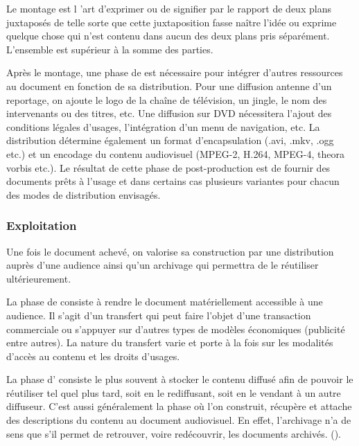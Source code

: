 \begin{cico}
Le montage est l 'art d'exprimer ou de signifier par le rapport de deux plans juxtaposés de telle sorte que cette juxtaposition fasse naître l'idée ou exprime quelque chose qui n'est contenu dans aucun des deux plans pris séparément. L'ensemble est supérieur à la somme des parties.
\end{cico}

Après le montage, une phase de  est nécessaire pour intégrer d'autres ressources au document en fonction de sa distribution. 
Pour une diffusion antenne d'un reportage, on ajoute le logo de la chaîne de télévision, un jingle, le nom des intervenants ou des titres, etc. 
Une diffusion sur DVD nécessitera l'ajout des conditions
légales d'usages, l'intégration d'un menu de navigation, etc. 
La distribution détermine également un format d'encapsulation (.avi, .mkv, .ogg etc.) et un encodage du contenu audiovisuel (MPEG-2, H.264, MPEG-4, theora vorbis etc.). 
Le résultat de cette phase de post-production est de fournir des documents prêts à l'usage et dans certains cas plusieurs variantes pour chacun des modes de distribution envisagés.


\subsubsection*{Exploitation}
Une fois le document achevé, on valorise sa construction par une distribution auprès d'une audience ainsi qu'un archivage qui permettra de le réutiliser ultérieurement.

La phase de  consiste à rendre le document matériellement accessible à une audience. 
Il s'agit d'un transfert qui peut faire l'objet d'une transaction commerciale ou s'appuyer sur d'autres types de modèles économiques (publicité entre autres). 
La nature du transfert varie et porte à la fois sur les modalités d'accès au contenu et les droits d'usages.

La phase d' consiste le plus souvent à stocker le contenu diffusé afin de pouvoir le réutiliser tel quel plus tard, soit en le rediffusant, soit en le vendant à un autre diffuseur. 
C'est aussi généralement la phase où l'on construit, récupère et attache des descriptions du contenu au document audiovisuel. 
En effet, l'archivage n'a de sens que s'il permet de retrouver, voire redécouvrir, les documents archivés.
 (\cite{Blanc2006}).%




